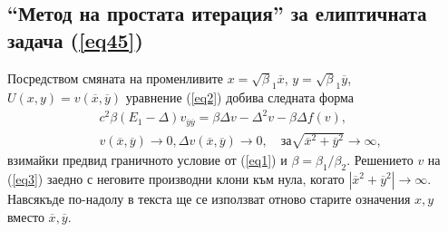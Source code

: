 \documentclass{article}
\newcommand{\rf}[1]{(\ref{#1})}
\theoremstyle{remark}
\begin{document}
\subsection{``Метод на простата итерация'' за елиптичната задача \rf{eq45}}\label{simpleIteration}
Посредством смяната на променливите $x=\sqrt\beta_1 { \overline x}$, $y=\sqrt\beta_1 { \overline y}$, $U(x,y)= v({ \overline x},{ \overline y} )$ уравнение 
\rf{eq2} добива следната форма
 \begin{align}\label{eq3}
&c^2 \beta (E_1- \Delta) v_{{\overline y}{\overline y}} = \beta \Delta v - \Delta^2 v - \beta \Delta f(v), \\ 
&v(\overline x, \overline y) \rightarrow 0,  \Delta v(\overline x, \overline y) \rightarrow 0 ,  \quad \text{за}  \sqrt{\overline x^2 + \overline y^2} \rightarrow \infty, \nonumber
\end{align}
взимайки предвид граничното условие от \rf{eq1} и $\beta = \beta_1 / \beta_2$.
Решението $v$ на \rf{eq3} заедно с неговите производни клони към нула, когато $|{\overline x}^2 +{\overline y}^2|\rightarrow \infty$.
Навсякъде по-надолу в текста ще се използват отново старите означения $x,y$ вместо ${\overline x},{\overline y}$.
\end{document}
